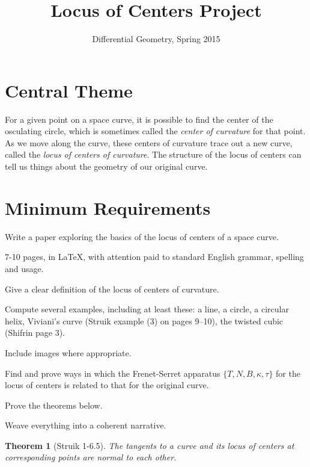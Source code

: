 \documentclass[11pt]{amsart}
\theoremstyle{plain}
\newtheorem*{theorem}{Theorem}
\begin{document}
\title{Locus of Centers Project}
\author{Differential Geometry, Spring 2015}

\maketitle

\section*{Central Theme}

For a given point on a space curve, it is possible to find the center of the osculating 
circle, which is sometimes called the \emph{center of curvature} for that point. As we 
move along the curve, these centers of curvature trace out a new curve, called the 
\emph{locus of centers of curvature}. The structure of the locus of centers can tell us 
things about the geometry of our original curve.

\section*{Minimum Requirements}

Write a paper exploring the basics of the locus of centers of a space curve.
\begin{compactitem}
\item 7-10 pages, in \LaTeX, with attention paid to standard English grammar, spelling and usage.
\item Give a clear definition of the locus of centers of curvature.
\item Compute several examples, including at least these: a line, a circle, a circular helix, Viviani's curve (Struik example (3) on pages 9--10), the twisted cubic (Shifrin page 3).
\item Include images where appropriate.
\item Find and prove ways in which the Frenet-Serret apparatus $\{ T, N, B, \kappa, \tau\}$ for the locus of centers is related to that for the original curve.
\item Prove the theorems below.
\item Weave everything into a coherent narrative.
\end{compactitem}

\begin{theorem} [Struik 1-6.5]
The tangents to a curve and its locus of centers at corresponding points are normal to each other.
\end{theorem}
\end{document}
